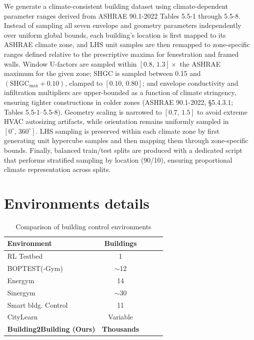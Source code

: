 \documentclass[10pt]{article} %
\begin{document}
\begin{itemize}
We generate a climate-consistent building dataset using climate-dependent parameter ranges derived from ASHRAE 90.1-2022 Tables 5.5-1 through 5.5-8. Instead of sampling all seven envelope and geometry parameters independently over uniform global bounds, each building’s location is first mapped to its ASHRAE climate zone, and LHS unit samples are then remapped to zone-specific ranges defined relative to the prescriptive maxima for fenestration and framed walls. Window U-factors are sampled within $[0.8,\,1.3]\times$ the ASHRAE maximum for the given zone; SHGC is sampled between 0.15 and $(\text{SHGC}_{\max} + 0.10)$, clamped to $[0.10,\,0.80]$; and envelope conductivity and infiltration multipliers are upper-bounded as a function of climate stringency, ensuring tighter constructions in colder zones (ASHRAE 90.1-2022, \S5.4.3.1; Tables 5.5-1--5.5-8). Geometry scaling is narrowed to $[0.7,\,1.5]$ to avoid extreme HVAC autosizing artifacts, while orientation remains uniformly sampled in $[0^\circ,\,360^\circ]$. LHS sampling is preserved within each climate zone by first generating unit hypercube samples and then mapping them through zone-specific bounds. Finally, balanced train/test splits are produced with a dedicated script that performs stratified sampling by location (90/10), ensuring proportional climate representation across splits.

\section{Environments details}
\label{apdx:environments_details}

\begin{table}
\centering
\caption{Comparison of building control environments}
\label{tab:hvac_envs}
\setlength{\tabcolsep}{4pt} %
\begin{tabular}{@{}lcccc@{}}
\toprule
\textbf{Environment} & \textbf{Buildings} \\
\midrule
RL Testbed \cite{moriyama2018} & 1   \\
BOPTEST(-Gym) \cite{blum2021} & $\sim$12  \\
Energym \cite{scharnhorst2021} & 14   \\
Sinergym \cite{campoy2025} & $\sim$30  \\
Smart bldg. Control \cite{goldfeder2025}  & 11  \\
CityLearn \cite{nweye2024} & Variable  \\
\textbf{Building2Building (Ours)} & \textbf{Thousands}   \\
\bottomrule
\end{tabular}
\end{table}


\end{itemize}
\end{document}
